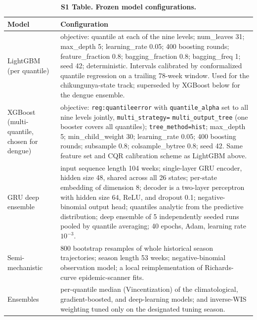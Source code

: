 \documentclass[11pt]{article}
\begin{document}
\begin{table}[t]
\centering\small
\caption{\textbf{S1 Table. Frozen model configurations.}}
\label{tab:hparams}
\begin{tabular}{@{}p{}p{}@{}}
\toprule
\textbf{Model} & \textbf{Configuration} \\
\midrule
LightGBM (per quantile) & objective: quantile at each of the nine levels; num\_leaves 31; max\_depth 5;
learning\_rate 0.05; 400 boosting rounds; feature\_fraction 0.8; bagging\_fraction 0.8; bagging\_freq 1;
seed 42; deterministic. Intervals calibrated by conformalized quantile regression on a trailing
78-week window. Used for the chikungunya-state track; superseded by XGBoost below for the dengue
ensemble. \\
\addlinespace
XGBoost (multi-quantile, chosen for dengue) & objective: \texttt{reg:quantileerror} with
\texttt{quantile\_alpha} set to all nine levels jointly, \texttt{multi\_strategy=}
\texttt{multi\_output\_tree} (one booster covers all quantiles); \texttt{tree\_method=hist};
max\_depth 5; min\_child\_weight 30; learning\_rate 0.05; 400 boosting rounds; subsample 0.8;
colsample\_bytree 0.8; seed 42. Same feature set and CQR calibration scheme as LightGBM above. \\
\addlinespace
GRU deep ensemble & input sequence length 104 weeks; single-layer GRU encoder, hidden size 48, shared
across all 26 states; per-state embedding of dimension 8; decoder is a two-layer perceptron with
hidden size 64, ReLU, and dropout 0.1; negative-binomial output head; quantiles analytic from the
predictive distribution; deep ensemble of 5 independently seeded runs pooled by quantile averaging;
40 epochs, Adam, learning rate $10^{-3}$. \\
\addlinespace
Semi-mechanistic & 800 bootstrap resamples of whole historical season trajectories; season length 53
weeks; negative-binomial observation model; a local reimplementation of Richards-curve
epidemic-scanner fits. \\
\addlinespace
Ensembles & per-quantile median (Vincentization) of the climatological, gradient-boosted, and
deep-learning models; and inverse-WIS weighting tuned only on the designated tuning season. \\
\bottomrule
\end{tabular}
\end{table}
\end{document}
